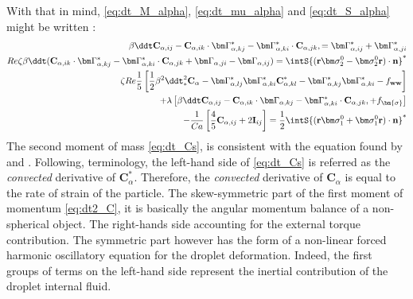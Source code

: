 With that in mind, \ref{eq:dt_M_alpha}, \ref{eq:dt_mu_alpha} and \ref{eq:dt_S_alpha} might be written :
\begin{align}
    \beta \ddt \textbf{C}_{\alpha,ij}
    - \textbf{C}_{\alpha,ik} \cdot \bm\Gamma_{\alpha,kj}^*
    - \bm\Gamma_{\alpha,ki}^* \cdot \textbf{C}_{\alpha,jk},
    = 
    \bm\Gamma_{\alpha,ij}^*
    +  \bm\Gamma_{\alpha,ji}^*\\
    Re \zeta \beta \ddt( \textbf{C}_{\alpha,ik} \cdot \bm\Gamma_{\alpha,kj}^*
    -  \bm\Gamma_{\alpha,ki}^* \cdot \textbf{C}_{\alpha,jk}
    + \bm\Gamma_{\alpha,ji} - \bm\Gamma_{\alpha,ij})
    =  \intS{(\textbf{r}\bm\sigma_2^0- \bm\sigma_2^0\textbf{r})\cdot \textbf{n}}^*\\
    \zeta Re \frac{1}{5}  
    \left[
        \frac{1}{2}\beta^2 \ddt^2_* \textbf{C}_\alpha
        - \bm\Gamma_{\alpha,lj}^* \bm\Gamma_{\alpha,ki}^* \textbf{C}_{\alpha,kl}^* 
        - \bm\Gamma_{\alpha,kj}^* \bm\Gamma_{\alpha,ki}^* 
        - f_\textbf{ww}
    \right]\nonumber\\
    + \lambda \left[
        \beta \ddt \textbf{C}_{\alpha,ij}
        -\textbf{C}_{\alpha,ik} \cdot \bm\Gamma_{\alpha,kj}
        - \bm\Gamma_{\alpha,ki}^* \cdot \textbf{C}_{\alpha,jk},
        + f_{\bm{\sigma}}
    \right]\nonumber\\
    - \frac{1}{Ca}\left[
        \frac{4}{5} \textbf{C}_{\alpha,ij}
        +2 \textbf{I}_{ij} 
    \right]
    =
    \frac{1}{2}\intS{(\textbf{r}\bm\sigma_1^0+ \bm\sigma_1^0\textbf{r})\cdot \textbf{n}}^*
\end{align}
The second moment of mass \ref{eq:dt_Cs}, is consistent with the equation found by \citet{goddard1967nonlinear} and \citet{lhuillier1987phenomenology}. 
Following, \citet{goddard1967nonlinear}  terminology, the left-hand side of \ref{eq:dt_Cs} is referred as the \textit{convected} derivative of $\textbf{C}^*_\alpha$. 
Therefore, the \textit{convected} derivative of $\textbf{C}_\alpha$ is equal to the rate of strain of the particle. 
The skew-symmetric part of the first moment of momentum \ref{eq:dt2_C}, it is basically the angular momentum balance of a non-spherical object. 
The right-hands side accounting for the external torque contribution. 
The symmetric part however has the form of a non-linear forced harmonic oscillatory equation for the droplet deformation. 
Indeed, the first groups of terms on the left-hand side represent the inertial contribution of the droplet internal fluid. 
